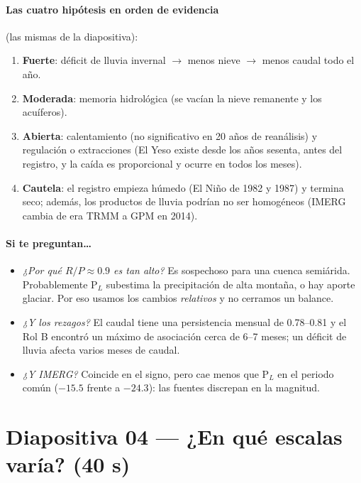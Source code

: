 \documentclass[11pt,letterpaper]{article}
\begin{document}
\paragraph{Las cuatro hipótesis en orden de evidencia} (las mismas de la diapositiva):
\begin{enumerate}
\item \textbf{Fuerte}: déficit de lluvia invernal $\rightarrow$ menos nieve $\rightarrow$ menos caudal todo el año.
\item \textbf{Moderada}: memoria hidrológica (se vacían la nieve remanente y los acuíferos).
\item \textbf{Abierta}: calentamiento (no significativo en 20 años de reanálisis) y regulación o extracciones
(El Yeso existe desde los años sesenta, antes del registro, y la caída es proporcional y ocurre en todos los
meses).
\item \textbf{Cautela}: el registro empieza húmedo (El Niño de 1982 y 1987) y termina seco; además, los
productos de lluvia podrían no ser homogéneos (IMERG cambia de era TRMM a GPM en 2014).
\end{enumerate}

\paragraph{Si te preguntan\ldots}
\begin{itemize}
\item \emph{¿Por qué $R/P\approx0.9$ es tan alto?} Es sospechoso para una cuenca semiárida. Probablemente
P$_L$ subestima la precipitación de alta montaña, o hay aporte glaciar. Por eso usamos los cambios
\emph{relativos} y no cerramos un balance.
\item \emph{¿Y los rezagos?} El caudal tiene una persistencia mensual de 0.78--0.81 y el Rol B encontró un
máximo de asociación cerca de 6--7 meses; un déficit de lluvia afecta varios meses de caudal.
\item \emph{¿Y IMERG?} Coincide en el signo, pero cae menos que P$_L$ en el periodo común ($-15.5$ frente a
$-24.3$): las fuentes discrepan en la magnitud.
\end{itemize}

\section{Diapositiva 04 --- ¿En qué escalas varía? (40 s)}
\end{document}
